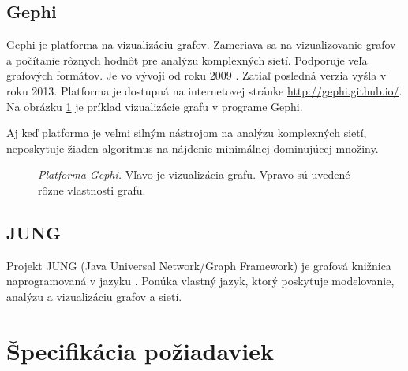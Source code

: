 \subsection{Gephi}

Gephi je platforma na vizualizáciu grafov. Zameriava sa na vizualizovanie 
grafov a počítanie rôznych hodnôt pre analýzu komplexných sietí. Podporuje veľa 
grafových formátov. Je vo vývoji od roku 2009 \citep{gephi}. Zatiaľ posledná 
verzia vyšla v roku 2013. Platforma je dostupná na internetovej stránke 
\url{http://gephi.github.io/}. Na obrázku \ref{img:vis:gephi} je príklad 
vizualizácie grafu v programe Gephi.

Aj keď platforma je veľmi silným nástrojom na analýzu komplexných sietí, 
neposkytuje žiaden algoritmus na nájdenie minimálnej dominujúcej množiny.

\begin{landscape}
\begin{figure}
	\centering
	\caption{\emph{Platforma Gephi.} Vľavo je vizualizácia grafu. Vpravo sú 
		uvedené rôzne vlastnosti grafu.}
	\label{img:vis:gephi}
\end{figure}
\end{landscape}

\subsection{JUNG}

Projekt JUNG (Java Universal Network/Graph Framework) je grafová knižnica 
naprogramovaná v jazyku \Java. Ponúka vlastný jazyk, ktorý poskytuje 
modelovanie, analýzu a vizualizáciu grafov a sietí.

\section{Špecifikácia požiadaviek}

